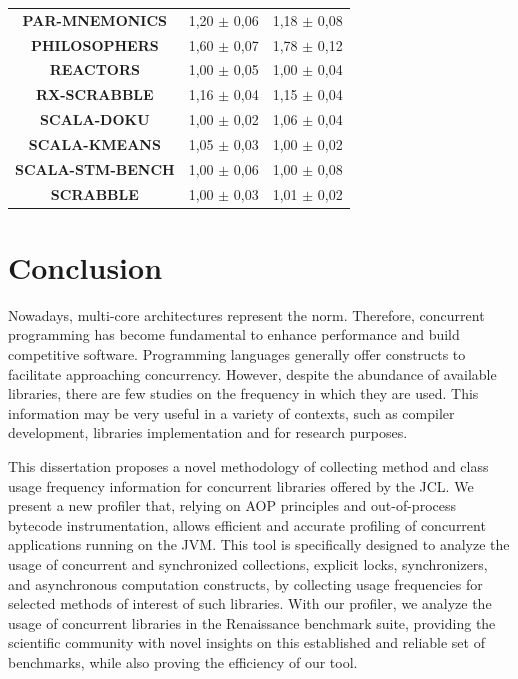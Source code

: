 \documentclass[]{usiinfthesis}
\begin{document}
\begin{table}
\begin{tabular}{|c|c|c|}
\textbf{	PAR-MNEMONICS	}&	 1,20 	 $\pm$ 	 0,06 	 & 	 1,18 	 $\pm$ 	 0,08 	\\
\textbf{	PHILOSOPHERS	}&	 1,60 	 $\pm$ 	 0,07 	 & 	 1,78 	 $\pm$ 	 0,12 	\\
\textbf{	REACTORS	}&	 1,00 	 $\pm$ 	 0,05 	 & 	 1,00 	 $\pm$ 	 0,04 	\\
\textbf{	RX-SCRABBLE	}&	 1,16 	 $\pm$ 	 0,04 	 & 	 1,15 	 $\pm$ 	 0,04 	\\
\textbf{	SCALA-DOKU	}&	 1,00 	 $\pm$ 	 0,02 	 & 	 1,06 	 $\pm$ 	 0,04 	\\
\textbf{	SCALA-KMEANS	}&	 1,05 	 $\pm$ 	 0,03 	 & 	 1,00 	 $\pm$ 	 0,02 	\\
\textbf{	SCALA-STM-BENCH	}&	 1,00 	 $\pm$ 	 0,06 	 & 	 1,00 	 $\pm$ 	 0,08 	\\
\textbf{	SCRABBLE	}&	 1,00 	 $\pm$ 	 0,03 	 & 	 1,01 	 $\pm$ 	 0,02 	\\

\hline
\end{tabular}
\end{table}%



\chapter{Conclusion}

Nowadays, multi-core architectures represent the norm. Therefore, concurrent programming has become fundamental to enhance performance and build competitive software. Programming languages generally offer constructs to facilitate approaching concurrency. However, despite the abundance of available libraries, there are few studies on the frequency in which they are used. This information may be very useful in a variety of contexts, such as compiler development, libraries implementation and for research purposes.

This dissertation proposes a novel methodology of collecting method and class usage frequency information for concurrent libraries offered by the JCL. We present a new profiler that, relying on AOP principles and out-of-process bytecode instrumentation, allows efficient and accurate profiling of concurrent applications running on the JVM. This tool is specifically designed to analyze the usage of concurrent and synchronized collections, explicit locks, synchronizers, and asynchronous computation constructs, by collecting usage frequencies for selected methods of interest of such libraries. With our profiler, we analyze the usage of concurrent libraries in the Renaissance benchmark suite, providing the scientific community with novel insights on this established and reliable set of benchmarks, while also proving the efficiency of our tool.
\end{document}

